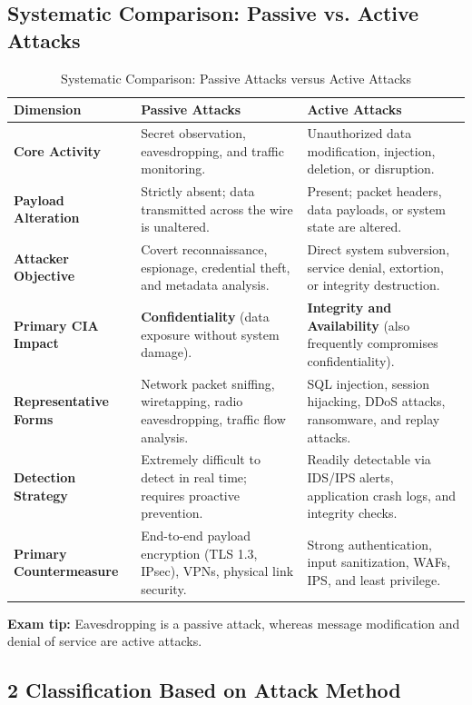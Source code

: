 \subsection{Systematic Comparison: Passive vs. Active Attacks}

\begin{table}[htbp]
\centering
\caption{Systematic Comparison: Passive Attacks versus Active Attacks}
\label{tab:passive_vs_active}
\begin{tabularx}{\textwidth}{p{3.2cm} p{5.5cm} X}
\toprule
\textbf{Dimension} & \textbf{Passive Attacks} & \textbf{Active Attacks} \\
\midrule
\textbf{Core Activity} & Secret observation, eavesdropping, and traffic monitoring. & Unauthorized data modification, injection, deletion, or disruption. \\
\textbf{Payload Alteration} & Strictly absent; data transmitted across the wire is unaltered. & Present; packet headers, data payloads, or system state are altered. \\
\textbf{Attacker Objective} & Covert reconnaissance, espionage, credential theft, and metadata analysis. & Direct system subversion, service denial, extortion, or integrity destruction. \\
\textbf{Primary CIA Impact} & \textbf{Confidentiality} (data exposure without system damage). & \textbf{Integrity and Availability} (also frequently compromises confidentiality). \\
\textbf{Representative Forms} & Network packet sniffing, wiretapping, radio eavesdropping, traffic flow analysis. & SQL injection, session hijacking, DDoS attacks, ransomware, and replay attacks. \\
\textbf{Detection Strategy} & Extremely difficult to detect in real time; requires proactive prevention. & Readily detectable via IDS/IPS alerts, application crash logs, and integrity checks. \\
\textbf{Primary Countermeasure} & End-to-end payload encryption (TLS 1.3, IPsec), VPNs, physical link security. & Strong authentication, input sanitization, WAFs, IPS, and least privilege. \\
\bottomrule
\end{tabularx}
\end{table}


\textbf{Exam tip:} Eavesdropping is a passive attack, whereas message modification and denial of service are active attacks.

\subsection{2 Classification Based on Attack Method}


